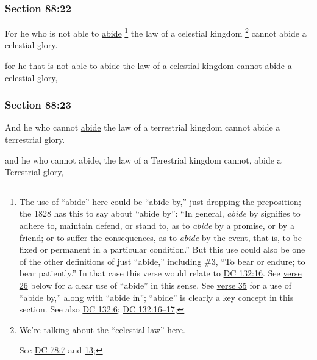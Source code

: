 	\subsubsection{Section 88:22} %
		\label{DC88-22}

		For he who is not able to \hyperref[ABIDE]{abide}%
			\footnote{%
				The use of ``abide'' here could be ``abide by,'' just dropping the preposition; the 1828 has this to say about ``abide by'': ``In general, \textit{abide} by signifies to adhere to, maintain defend, or stand to, as to \textit{abide} by a promise, or by a friend; or to suffer the consequences, as to \textit{abide} by the event, that is, to be fixed or permanent in a particular condition.'' But this use could also be one of the other definitions of just ``abide,'' including \#3, ``To bear or endure; to bear patiently.'' In that case this verse would relate to \hyperref[DC132-16]{DC 132:16}. See \hyperref[DC88-26]{verse 26} below for a clear use of ``abide'' in this sense. See \hyperref[DC88-35]{verse 35} for a use of ``abide by,'' along with ``abide in''; ``abide'' is clearly a key concept in this section. See also \hyperref[DC132-6]{DC 132:6}; \hyperref[DC132-16]{DC 132:16--17}; 
				}
		the law of a celestial kingdom%
			\footnote{%
				We're talking about the ``celestial law'' here.
				
				See \hyperref[DC78-7]{DC 78:7} and \hyperref[DC78-13]{13}; 
				}
		cannot abide a celestial glory.

		\begin{framed}
		\scriptsize
			\begin{compactdesc}
				\item[JSP] for he that is not able to abide the law of a celestial kingdom cannot abide a celestial glory,
			\end{compactdesc}
		\end{framed}

	\subsubsection{Section 88:23} %
		\label{DC88-23}

		And he who cannot \hyperref[ABIDE]{abide} the law of a terrestrial kingdom cannot abide a terrestrial glory.

		\begin{framed}
		\scriptsize
			\begin{compactdesc}
				\item[JSP] and he who cannot abide, the law of a Terestrial kingdom cannot, abide a Terestrial glory,
			\end{compactdesc}
		\end{framed}

